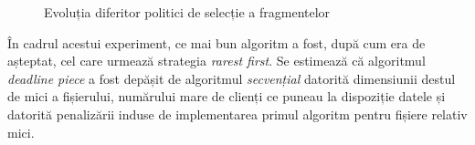 \begin{figure}
  \centering
  \caption{Evoluția diferitor politici de selecție a fragmentelor}
  \label{fig:multimedia-dist:libtorrent-evolution}
\end{figure}

În cadrul acestui experiment, ce mai bun algoritm a fost, după cum era de
așteptat, cel care urmează strategia \textit{rarest first}. Se estimează că
algoritmul \textit{deadline piece} a fost depășit de algoritmul
\textit{secvențial} datorită dimensiunii destul de mici a fișierului,
numărului mare de clienți ce puneau la dispoziție datele și datorită
penalizării induse de implementarea primul algoritm pentru fișiere
relativ mici.

